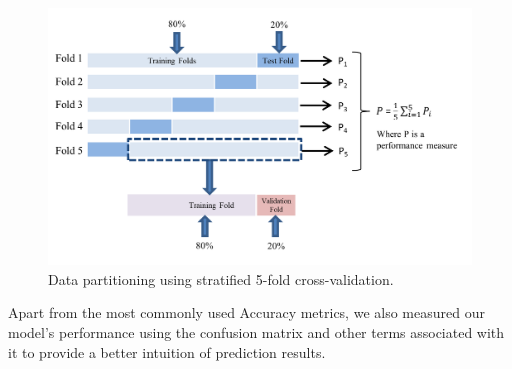 \begin{figure}[h!]
\centering
\includegraphics[scale=0.99]{figures/Figure 4.3.png}
\caption{Data partitioning using stratified 5-fold cross-validation.}
\label{fig:4.3}
\end{figure}

Apart from the most commonly used Accuracy metrics, we also measured our model’s
performance using the confusion matrix and other terms associated with it to provide a better
intuition of prediction results.\\

